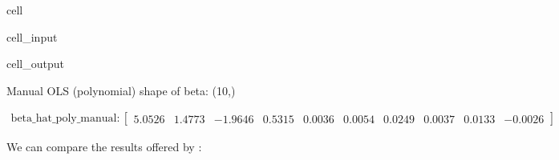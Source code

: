 \documentclass[letterpaper,10pt,english]{jupyterBook}
\begin{document}
\begin{sphinxuseclass}{cell}\begin{sphinxVerbatimInput}

\begin{sphinxuseclass}{cell_input}
\begin{sphinxVerbatim}[commandchars=\\\{\}]
    
  
    
    
  

 
 
\end{sphinxVerbatim}

\end{sphinxuseclass}\end{sphinxVerbatimInput}
\begin{sphinxVerbatimOutput}

\begin{sphinxuseclass}{cell_output}
\begin{sphinxVerbatim}[commandchars=\\\{\}]
Manual OLS (polynomial) shape of beta: (10,)
\end{sphinxVerbatim}
\begin{equation*}
\begin{split}\displaystyle \text{beta\_hat\_poly\_manual}:\left[
\begin{array}{}
  5.0526 &  1.4773 & -1.9646 &  0.5315 &  0.0036 &  0.0054 &  0.0249 &  0.0037 &  0.0133 & -0.0026
\end{array}
\right]\end{split}
\end{equation*}
\end{sphinxuseclass}\end{sphinxVerbatimOutput}

\end{sphinxuseclass}
\sphinxAtStartPar
We can compare the results offered by :
\end{document}
